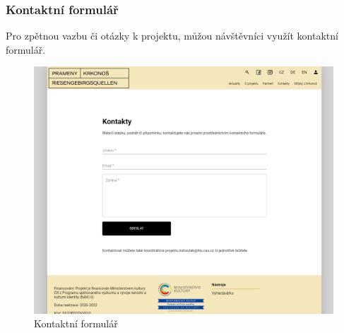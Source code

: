 \subsubsection{Kontaktní formulář}
Pro zpětnou vazbu či otázky k projektu, můžou návštěvníci využít kontaktní formulář.
\begin{figure}[H]
	\centering
	\includegraphics[width=.8\linewidth]{img/contactScene.png}
	\caption{Kontaktní formulář}
\end{figure}

